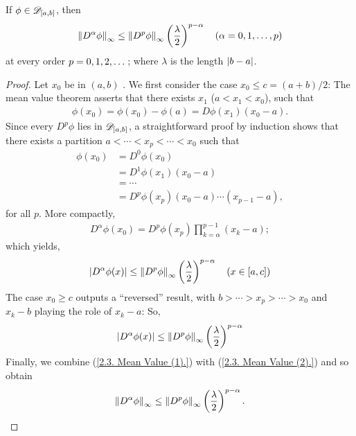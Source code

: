 If 
%
  $\phi\in{\mathscr D}_{[a, b]}$, then %
%
%
  \begin{align}\label{2.3. Mean value inequality.}
    \norm{D^\alpha \phi}_{\infty} 
      \leq 
    \norm{D^p \phi}_{\infty} \left(\frac{\lambda}{2}\right)^{p-\alpha}
      \quad (\alpha = 0, 1, \dots, p) 
  \end{align}
%
at every order $p=0, 1, 2, \dots$; %
where $\lambda$ is the length $\abs{b-a}$. %
%
\begin{proof}
Let $x_0$ be in %
% 
    $(a, b)$ .
% 
We first consider the case $x_0 \leq c = (a+b)/2$: %
The mean value theorem asserts that there exists %
%
  $x_{1}$ ($a <x_{1} < x_{0} $), 
%
such that 
%
  \begin{align}
    \phi(x_0) =\phi(x_0) - \phi(a)=  D\phi(x_{1})(x_{0} -a).
  \end{align}
%
Since every %
%
  $D^p\phi$ lies in ${\mathscr D}_{[a, b]}$, %
%
a straightforward proof by induction shows that there exists a partition %
%
  $a < \cdots < x_p < \cdots < x_0 $ 
%
such that 
  \begin{align}
    \phi(x_0) & = D^0 \phi(x_0) \\ 
              & = D^1\phi(x_{1})(x_{0} - a ) \\
              & = \cdots \nonumber\\
              & = D^p\phi(x_{p})(x_{0} - a)\cdots(x_{p-1}-a),
  \end{align}
%
for all $p$. %
More compactly, 
%
  \begin{align}
      D^\alpha \phi (x_0) = D^p\phi(x_p) \prod_{k= \alpha}^{p-1}(x_k - a);
  \end{align}
%
which yields, 
%
  \begin{align}\label{2.3. Mean Value (1).}
    \lvert D^\alpha \phi(x) \rvert
      \leq 
    \norm{D^p \phi}_{\infty} 
    \left(\frac{\lambda}{2}\right)^{p-\alpha}
    \quad (x \in [a, c])
  \end{align}
%
The case $x_0 \geq c$ outputs a ``reversed'' result, with %
%
  $b > \cdots > x_p > \cdots > x_0$ %
%
and $x_k -b$ playing the role of $x_k-a$: %
So, %
%
  \begin{align}\label{2.3. Mean Value (2).}
    \lvert D^\alpha \phi(x) \rvert
      \leq 
    \norm{D^p \phi}_{\infty} 
    \left(\frac{\lambda}{2}\right)^{p-\alpha} 
  \end{align}
%
Finally, we combine %
%
  (\ref{2.3. Mean Value (1).}) with %
  (\ref{2.3. Mean Value (2).}) %
%
and so obtain %
%
  \begin{align}
    \norm{D^\alpha \phi}_{\infty} 
      \leq 
    \norm{D^p \phi}_{\infty} 
    \left(\frac{\lambda}{2}\right)^{p-\alpha}.
  \end{align}
%
\end{proof}